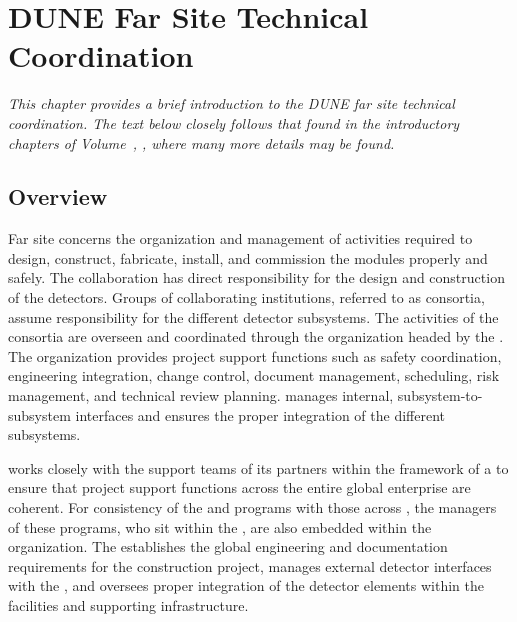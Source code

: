\chapter{DUNE Far Site Technical Coordination}
\label{ch:exec-tc}

\textit{This chapter provides a brief introduction to the DUNE far site technical coordination.  The text below closely follows that found in the introductory chapters of Volume~\volnumbertc{}, \voltitletc{}, where many more details may be found.}

\section{Overview}

Far site  concerns the organization and management of 
activities required to design, construct,
fabricate, install, and commission the   modules properly and safely. 
      The  collaboration has direct responsibility for the design 
and construction of the  detectors.  Groups of collaborating 
institutions, referred to as consortia, assume responsibility for 
the different detector subsystems.  The activities of the consortia are 
overseen and coordinated through the   organization 
headed by the  .  The  organization 
provides project support functions such as safety coordination, 
engineering integration, change control, document management, scheduling, 
risk management, and technical review planning.    
manages internal, subsystem-to-subsystem interfaces and ensures the proper integration of the different subsystems.   

  works closely with the support teams of its 
 partners within the framework of a  to 
ensure that project support functions across the entire global 
enterprise are coherent.  For consistency of the   
and  programs with those across , the 
managers of these programs, who sit within 
the , are also embedded within the   
organization.  The  establishes the global engineering
and documentation requirements for the  
 construction project, manages external  detector 
interfaces with the , and oversees proper 
integration of the  detector elements within the facilities 
and supporting infrastructure.  


